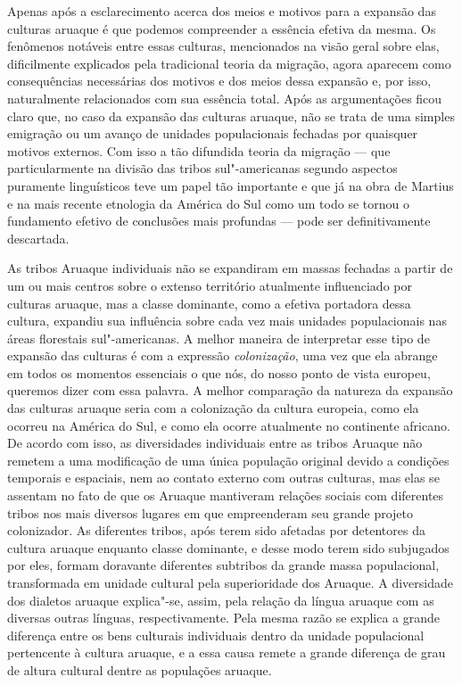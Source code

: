 Apenas após a esclarecimento acerca dos meios e motivos para a expansão das culturas aruaque
é que podemos compreender a essência efetiva da mesma. 
Os fenômenos notáveis entre essas culturas,
mencionados na visão geral sobre elas, dificilmente explicados pela tradicional 
teoria da migração, agora aparecem como
consequências necessárias dos motivos e dos meios dessa expansão e, por
isso, naturalmente relacionados com sua essência total. Após as
argumentações ficou claro que, no caso da expansão das culturas
aruaque, não se trata de uma simples emigração ou um avanço de unidades
populacionais fechadas por quaisquer motivos externos. Com isso a tão
difundida teoria da migração --- que particularmente na divisão das
tribos sul"-americanas segundo aspectos puramente linguísticos teve um
papel tão importante e que já na obra de Martius e na mais recente
etnologia da América do Sul como um todo se tornou o fundamento efetivo
de conclusões mais profundas --- pode ser definitivamente descartada. 

As tribos Aruaque individuais não se
expandiram em massas fechadas a partir de um ou mais centros sobre o
extenso território atualmente influenciado por culturas aruaque, mas a
classe dominante, como a efetiva portadora dessa cultura, expandiu sua
influência sobre cada vez mais unidades populacionais nas áreas
florestais sul"-americanas. A melhor maneira de interpretar esse tipo de
expansão das culturas é com a expressão \textit{colonização}, uma vez que
ela abrange em todos os momentos essenciais o que nós, do nosso ponto de
vista europeu, queremos dizer com essa palavra. A melhor comparação da
natureza da expansão das culturas aruaque seria com a colonização da
cultura europeia, como ela ocorreu na América do Sul, e como ela ocorre
atualmente no continente africano. De acordo com isso, as diversidades
individuais entre as tribos Aruaque não remetem a uma modificação de uma
única população original devido a condições temporais e espaciais, nem
ao contato externo com outras culturas, mas elas se assentam no fato de
que os Aruaque mantiveram relações sociais com diferentes tribos nos
mais diversos lugares em que empreenderam seu grande projeto
colonizador. As diferentes tribos, após terem sido afetadas por
detentores da cultura aruaque enquanto classe dominante, e desse modo
terem sido subjugados por eles, formam doravante diferentes subtribos da
grande massa populacional, transformada em unidade cultural pela
superioridade dos Aruaque. A diversidade dos dialetos aruaque
explica"-se, assim, pela relação da língua aruaque com as diversas outras
línguas, respectivamente. Pela mesma razão se explica a grande diferença
entre os bens culturais individuais dentro da unidade populacional
pertencente à cultura aruaque, e a essa causa remete a grande diferença
de grau de altura cultural dentre as populações aruaque.

